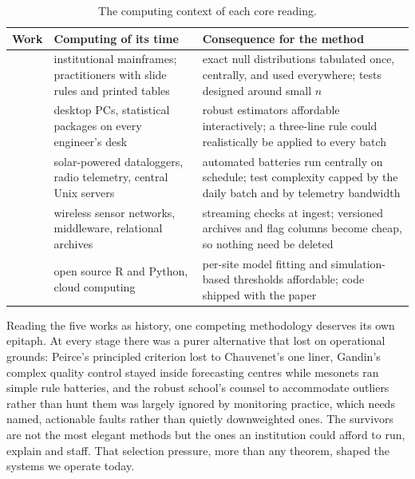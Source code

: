 \begin{table}[t]
  \centering
  \small
  \caption{The computing context of each core reading.}
  \label{tab:computing}
  \begin{tabular}{@{}lp{4.0cm}p{6.9cm}@{}}
    \toprule
    Work & Computing of its time & Consequence for the method \\
    \midrule
    \citet{grubbs1969} & institutional mainframes; practitioners with slide
      rules and printed tables & exact null distributions tabulated once,
      centrally, and used everywhere; tests designed around small $n$ \\
    \citet{iglewicz1993} & desktop PCs, statistical packages on every
      engineer's desk & robust estimators affordable interactively; a
      three-line rule could realistically be applied to every batch \\
    \citet{shafer2000} & solar-powered dataloggers, radio telemetry,
      central Unix servers & automated batteries run centrally on schedule;
      test complexity capped by the daily batch and by telemetry bandwidth \\
    \citet{campbell2013} & wireless sensor networks, middleware, relational
      archives & streaming checks at ingest; versioned archives and flag
      columns become cheap, so nothing need be deleted \\
    \citet{leigh2019} & open source R and Python, cloud computing &
      per-site model fitting and simulation-based thresholds affordable;
      code shipped with the paper \\
    \bottomrule
  \end{tabular}
\end{table}

Reading the five works as history, one competing methodology deserves its own
epitaph. At every stage there was a purer alternative that lost on
operational grounds: Peirce's principled criterion lost to Chauvenet's one
liner, Gandin's complex quality control stayed inside forecasting centres
while mesonets ran simple rule batteries, and the robust school's counsel to
accommodate outliers rather than hunt them was largely ignored by monitoring
practice, which needs named, actionable faults rather than quietly
downweighted ones. The survivors are not the most elegant methods but the
ones an institution could afford to run, explain and staff. That selection
pressure, more than any theorem, shaped the systems we operate today.
